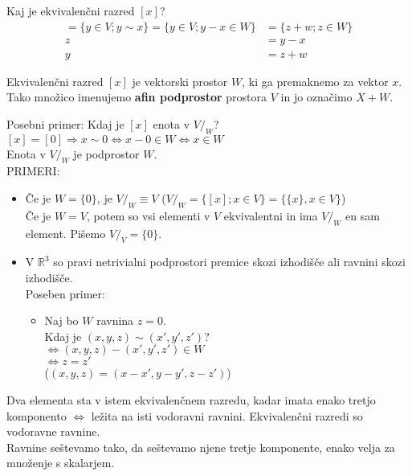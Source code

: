 \documentclass[a4paper,12pt]{article}
\begin{document}
Kaj je ekvivalenčni razred $[x]$? \\
\begin{align*}
[x]=\{y\in V; y\sim x\}=\{y\in V; y-x\in W\}&=\{z+w;z\in W\}\\
z&=y-x \\
y&=z+w
\end{align*}

Ekvivalenčni razred $[x]$ je vektorski prostor $W$, ki ga premaknemo za vektor $x$. Tako množico imenujemo \textbf{afin podprostor} prostora $V$ in jo označimo $X+W$.

\newpage

Posebni primer: Kdaj je $[x]$ enota v $V/_W$? \\

$[x]=[0]\Rightarrow x\sim 0 \Leftrightarrow x-0 \in W \Leftrightarrow x\in W$ \\

Enota v $V/_W$ je podprostor $W$. \\

PRIMERI:
\begin{itemize}
	\item Če je $W=\{0\}$, je $V/_W \equiv V$ ($V/_W=\{[x];x\in V\}=\{\{x\},x\in V\}$) \\
	Če je $W=V$, potem so vsi elementi v $V$ ekvivalentni in ima $V/_W$ en sam element. Pišemo $V/_V=\{0\}$.
	\item V $\mathbb{R}^3$ so pravi netrivialni podprostori premice skozi izhodišče ali ravnini skozi izhodišče. \\
	Poseben primer: 
	\begin{itemize}
		\item Naj bo $W$ ravnina $z=0$. \\
		Kdaj je $(x,y,z)\sim(x',y',z')$? \\
		$\Leftrightarrow (x,y,z)-(x',y',z')\in W$ \\
		$\Leftrightarrow z=z'$ \\
		($(x,y,z)=(x-x',y-y',z-z')$)\\
	\end{itemize}
\end{itemize}

Dva elementa sta v istem ekvivalenčnem razredu, kadar imata enako tretjo komponento $\Leftrightarrow$ ležita na isti vodoravni ravnini. Ekvivalenčni razredi so vodoravne ravnine.\\

Ravnine seštevamo tako, da seštevamo njene tretje komponente, enako velja za množenje s skalarjem.\\
\end{document}
